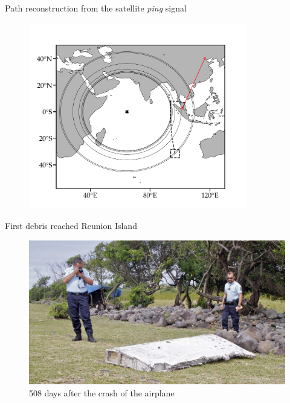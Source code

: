 \documentclass{beamer}
\begin{document}
\begin{frame}{Path reconstruction from the satellite \textit{ping} signal}
\begin{figure}[hbt]
  \includegraphics[width=0.85\textwidth]{figures/arcs_map.png}
\end{figure}
\end{frame}

\begin{frame}{First debris reached Reunion Island}

\begin{figure}[hbt]
  \includegraphics[width=\textwidth]{figures/flaperon.jpg}
  \caption{508 days after the crash of the airplane}
\end{figure}

\end{frame}
\end{document}
